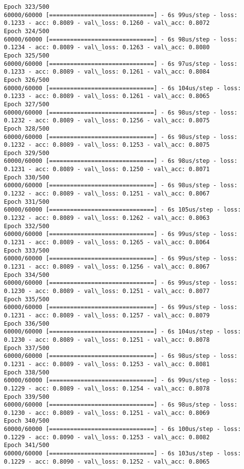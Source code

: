\documentclass[11pt]{article}
\begin{document}
\begin{Verbatim}[commandchars=\\\{\}]
Epoch 323/500
60000/60000 [==============================] - 6s 99us/step - loss: 0.1233 - acc: 0.8089 - val\_loss: 0.1260 - val\_acc: 0.8072
Epoch 324/500
60000/60000 [==============================] - 6s 98us/step - loss: 0.1234 - acc: 0.8089 - val\_loss: 0.1263 - val\_acc: 0.8080
Epoch 325/500
60000/60000 [==============================] - 6s 97us/step - loss: 0.1233 - acc: 0.8089 - val\_loss: 0.1261 - val\_acc: 0.8084
Epoch 326/500
60000/60000 [==============================] - 6s 104us/step - loss: 0.1233 - acc: 0.8089 - val\_loss: 0.1261 - val\_acc: 0.8065
Epoch 327/500
60000/60000 [==============================] - 6s 98us/step - loss: 0.1232 - acc: 0.8089 - val\_loss: 0.1256 - val\_acc: 0.8075
Epoch 328/500
60000/60000 [==============================] - 6s 98us/step - loss: 0.1232 - acc: 0.8089 - val\_loss: 0.1253 - val\_acc: 0.8075
Epoch 329/500
60000/60000 [==============================] - 6s 98us/step - loss: 0.1231 - acc: 0.8089 - val\_loss: 0.1250 - val\_acc: 0.8071
Epoch 330/500
60000/60000 [==============================] - 6s 98us/step - loss: 0.1232 - acc: 0.8089 - val\_loss: 0.1251 - val\_acc: 0.8067
Epoch 331/500
60000/60000 [==============================] - 6s 105us/step - loss: 0.1232 - acc: 0.8089 - val\_loss: 0.1262 - val\_acc: 0.8063
Epoch 332/500
60000/60000 [==============================] - 6s 99us/step - loss: 0.1231 - acc: 0.8089 - val\_loss: 0.1265 - val\_acc: 0.8064
Epoch 333/500
60000/60000 [==============================] - 6s 99us/step - loss: 0.1231 - acc: 0.8089 - val\_loss: 0.1256 - val\_acc: 0.8067
Epoch 334/500
60000/60000 [==============================] - 6s 99us/step - loss: 0.1230 - acc: 0.8089 - val\_loss: 0.1251 - val\_acc: 0.8077
Epoch 335/500
60000/60000 [==============================] - 6s 99us/step - loss: 0.1231 - acc: 0.8089 - val\_loss: 0.1257 - val\_acc: 0.8079
Epoch 336/500
60000/60000 [==============================] - 6s 104us/step - loss: 0.1230 - acc: 0.8089 - val\_loss: 0.1251 - val\_acc: 0.8078
Epoch 337/500
60000/60000 [==============================] - 6s 98us/step - loss: 0.1231 - acc: 0.8089 - val\_loss: 0.1253 - val\_acc: 0.8081
Epoch 338/500
60000/60000 [==============================] - 6s 99us/step - loss: 0.1229 - acc: 0.8089 - val\_loss: 0.1254 - val\_acc: 0.8078
Epoch 339/500
60000/60000 [==============================] - 6s 98us/step - loss: 0.1230 - acc: 0.8089 - val\_loss: 0.1251 - val\_acc: 0.8069
Epoch 340/500
60000/60000 [==============================] - 6s 100us/step - loss: 0.1229 - acc: 0.8090 - val\_loss: 0.1253 - val\_acc: 0.8082
Epoch 341/500
60000/60000 [==============================] - 6s 103us/step - loss: 0.1229 - acc: 0.8090 - val\_loss: 0.1252 - val\_acc: 0.8065

\end{Verbatim}
\end{document}
